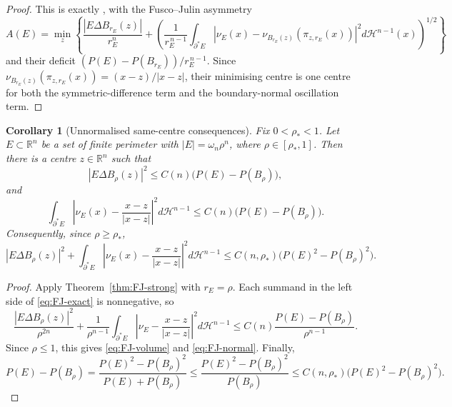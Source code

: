 \documentclass[11pt]{amsart}
\newtheorem{corollary}[theorem]{Corollary}
\theoremstyle{definition}
\newcommand{\R}{\mathbb R}
\newcommand{\rstar}{\rho_*}
\newcommand{\Hn}{\mathcal H^{n-1}}
\newcommand{\Per}{P}
\begin{document}
\begin{proof}
This is exactly \cite[Theorem~1.1]{FJ2014}, with the Fusco--Julin
asymmetry
\[
   A(E)=\min_z\left\{
      \frac{|E\Delta B_{r_E}(z)|}{r_E^n}
      +
      \left(
         \frac1{r_E^{\,n-1}}
         \int_{\partial^*E}
            \left|\nu_E(x)-\nu_{B_{r_E}(z)}
               (\pi_{z,r_E}(x))\right|^2d\Hn(x)
      \right)^{1/2}
   \right\}
\]
and their deficit
\((\Per(E)-\Per(B_{r_E}))/r_E^{\,n-1}\).  Since
\(\nu_{B_{r_E}(z)}(\pi_{z,r_E}(x))=(x-z)/|x-z|\), their minimising centre
is one centre for both the symmetric-difference term and the boundary-normal
oscillation term.
\end{proof}

\begin{corollary}[Unnormalised same-centre consequences]
\label{cor:FJ-unnormalised}
Fix \(0<\rstar<1\).  Let \(E\subset\R^n\) be a set of finite perimeter with
\(|E|=\omega_n\rho^n\), where \(\rho\in[\rstar,1]\).  Then there is a
centre \(z\in\R^n\) such that
\begin{equation}\label{eq:FJ-volume}
   |E\Delta B_\rho(z)|^2
   \le C(n)\bigl(\Per(E)-\Per(B_\rho)\bigr),
\end{equation}
and
\begin{equation}\label{eq:FJ-normal}
   \int_{\partial^*E}
      \left|\nu_E(x)-\frac{x-z}{|x-z|}\right|^2d\Hn
   \le C(n)\bigl(\Per(E)-\Per(B_\rho)\bigr).
\end{equation}
Consequently, since \(\rho\ge\rstar\),
\begin{equation}\label{eq:FJ-DI-version}
   |E\Delta B_\rho(z)|^2
   +
   \int_{\partial^*E}
      \left|\nu_E(x)-\frac{x-z}{|x-z|}\right|^2d\Hn
   \le C(n,\rstar)
      \bigl(\Per(E)^2-\Per(B_\rho)^2\bigr).
\end{equation}
\end{corollary}

\begin{proof}
Apply Theorem~\ref{thm:FJ-strong} with \(r_E=\rho\).  Each summand in the
left side of \eqref{eq:FJ-exact} is nonnegative, so
\[
   \frac{|E\Delta B_\rho(z)|^2}{\rho^{2n}}
   +
   \frac1{\rho^{n-1}}
   \int_{\partial^*E}
      \left|\nu_E-\frac{x-z}{|x-z|}\right|^2d\Hn
   \le
   C(n)\frac{\Per(E)-\Per(B_\rho)}{\rho^{n-1}} .
\]
Since \(\rho\le1\), this gives \eqref{eq:FJ-volume} and
\eqref{eq:FJ-normal}.  Finally,
\[
   \Per(E)-\Per(B_\rho)
   =
   \frac{\Per(E)^2-\Per(B_\rho)^2}{\Per(E)+\Per(B_\rho)}
   \le
   \frac{\Per(E)^2-\Per(B_\rho)^2}{\Per(B_\rho)}
   \le C(n,\rstar)\bigl(\Per(E)^2-\Per(B_\rho)^2\bigr).
\]
\end{proof}
\end{document}
